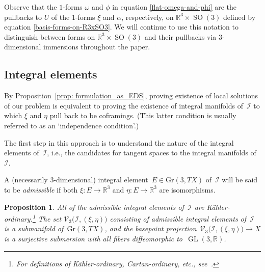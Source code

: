 \documentclass[11pt]{article}
\numberwithin{equation}{section}
\newtheorem{Proposition}[Theorem]{Proposition}
 { \theoremstyle{definition}
\newtheorem{Example}[Theorem]{Example}
\newtheorem{Remark}[Theorem]{Remark} }
\newcommand{\cI}{{\mathcal I}}
\newcommand{\cV}{{\mathcal V}}
\newcommand{\bbR}{{\mathbb R}}
\newcommand{\GL}{\operatorname{GL}}
\newcommand{\SO}{\operatorname{SO}}
\begin{document}
\begin{Remark}Observe that the $1$-forms $\omega$ and $\phi$ in equation \eqref{flat-omega-and-phi} are the pullbacks to $U$ of the $1$-forms $\xi$ and $\alpha$, respectively, on $\bbR^3 \times \SO(3)$ defined by equation \eqref{basis-forms-on-R3xSO3}. We will continue to use this notation to distinguish between forms on $\bbR^3 \times \SO(3)$ and their pullbacks via 3-dimensional immersions throughout the paper.
\end{Remark}



\subsection{Integral elements}
By Proposition~\ref{prop: formulation_as_EDS},
proving existence of local solutions of our problem
is equivalent to proving the existence of integral manifolds of~$\cI$
to which $\xi$ and $\eta$ pull back to be coframings. (This latter
condition is usually referred to as an `independence condition'.)

The first step in this approach
is to understand the nature of the integral elements of~$\cI$,
i.e., the candidates for tangent spaces to the integral manifolds of~$\cI$.

A (necessarily $3$-dimensional) integral element~$E\in\mathrm{Gr}(3,TX)$
of~$\cI$ will be said to be \emph{admissible}
if both $\xi\colon E\to\bbR^3$ and $\eta\colon E\to\bbR^3$ are isomorphisms.

\begin{Proposition}\label{prop: K-ordinaryintegralelements}
All of the admissible integral elements of~$\cI$ are K\"ahler-ordinary.\footnote{For definitions of K\"ahler-ordinary, Cartan-ordinary, etc.,
see~\cite[Chapter~III, Definition~1.7]{BCGGG}.}
The set $\cV_3\bigl(\cI,(\xi,\eta)\bigr)$
consisting of admissible integral elements of~$\cI$
is a submanifold of~$\mathrm{Gr}(3,TX)$,
and the basepoint projection~$\cV_3\bigl(\cI,(\xi,\eta)\bigr)\to X$
is a surjective submersion
with all fibers diffeomorphic to~$\GL(3,\bbR)$.
\end{Proposition}
\end{document}
